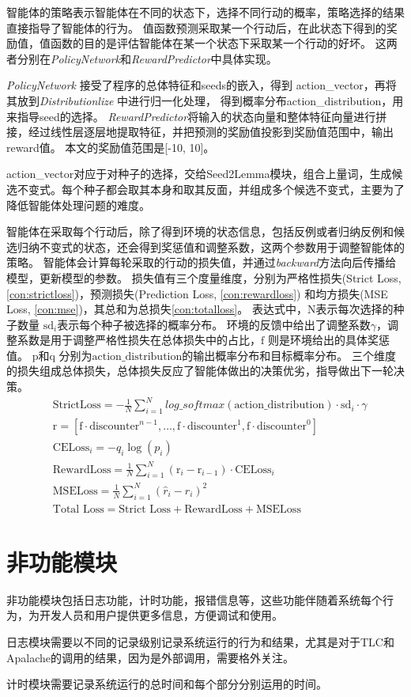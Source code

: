 智能体的策略表示智能体在不同的状态下，选择不同行动的概率，策略选择的结果直接指导了智能体的行为。
值函数预测采取某一个行动后，在此状态下得到的奖励值，值函数的目的是评估智能体在某一个状态下采取某一个行动的好坏。
这两者分别在\textit{PolicyNetwork}和\textit{RewardPredictor}中具体实现。

\textit{PolicyNetwork} 接受了程序的总体特征和seeds的嵌入，得到 action\_vector，再将其放到\textit{Distributionlize} 中进行归一化处理，
得到概率分布action\_distribution，用来指导seed的选择。
\textit{RewardPredictor}将输入的状态向量和整体特征向量进行拼接，经过线性层逐层地提取特征，并把预测的奖励值投影到奖励值范围中，输出reward值。
本文的奖励值范围是[-10, 10]。

action\_vector对应于对种子的选择，交给Seed2Lemma模块，组合上量词，生成候选不变式。每个种子都会取其本身和取其反面，并组成多个候选不变式，主要为了降低智能体处理问题的难度。

智能体在采取每个行动后，除了得到环境的状态信息，包括反例或者归纳反例和候选归纳不变式的状态，还会得到奖惩值和调整系数，这两个参数用于调整智能体的策略。
智能体会计算每轮采取的行动的损失值，并通过\textit{backward}方法向后传播给模型，更新模型的参数。
损失值有三个度量维度，分别为严格性损失(Strict Loss, \ref{con:strictloss})，预测损失(Prediction Loss, \ref{con:rewardloss})
和均方损失(MSE Loss, \ref{con:mse})，其总和为总损失\ref{con:totalloss}。
表达式中，$\text{N}$表示每次选择的种子数量 $\text{sd}_i$表示每个种子被选择的概率分布。
环境的反馈中给出了调整系数$\gamma$，调整系数是用于调整严格性损失在总体损失中的占比，$\text{f}$ 则是环境给出的具体奖惩值。
$\text{p}$和$\text{q}$ 分别为$\text{action\_distribution}$的输出概率分布和目标概率分布。
三个维度的损失组成总体损失，总体损失反应了智能体做出的决策优劣，指导做出下一轮决策。
\begin{align}
	&\text{StrictLoss} = - \frac{1}{N} \sum_{i=1}^{N} log\_softmax(\text{action\_distribution}) \cdot \text{sd}_i \cdot \gamma \label{con:strictloss} \\
	&\text{r} = \left[ \text{f} \cdot \text{discounter}^{n-1}, \ldots , \text{f} \cdot \text{discounter}^1, \text{f} \cdot \text{discounter}^{0} \right] \label{con:r}\\
	&\text{CELoss}_i = -q_{i} \log(p_{i}) \label{con:celoss} \\
	&\text{RewardLoss} = \frac{1}{N} \sum_{i=1}^{N} (\text{r}_{i} - \text{r}_{i-1}) \cdot \text{CELoss}_i \label{con:rewardloss} \\
	&\text{MSELoss} = \frac{1}{N} \sum_{i=1}^{N} (\hat{r}_i - r_i)^2\label{con:mse} \\
	&\text{Total Loss} = \text{Strict Loss}+\text{RewardLoss}+\text{MSELoss} \label{con:totalloss}
\end{align}



\section{非功能模块}

非功能模块包括日志功能，计时功能，报错信息等，这些功能伴随着系统每个行为，为开发人员和用户提供更多信息，方便调试和使用。

日志模块需要以不同的记录级别记录系统运行的行为和结果，尤其是对于TLC和Apalache的调用的结果，因为是外部调用，需要格外关注。

计时模块需要记录系统运行的总时间和每个部分分别运用的时间。